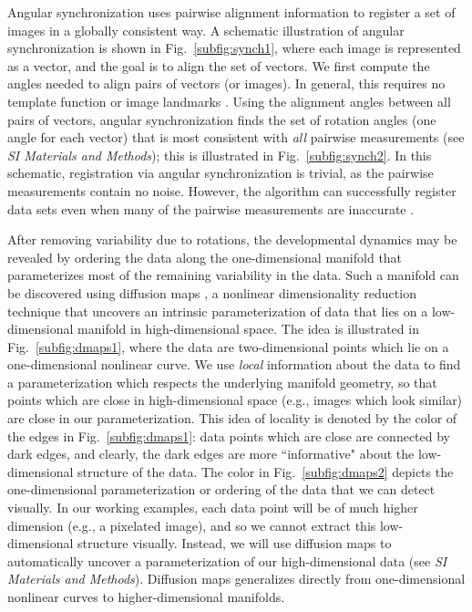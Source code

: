 \documentclass[twocolumn, 10pt]{article}
\newcommand{\SI}[0]{\textit{SI Materials and Methods}}
\newcommand{\fig}[0]{Fig.}
\begin{document}
Angular synchronization uses pairwise alignment information to register a set of images in a globally consistent way.
%
A schematic illustration of angular synchronization is shown in \fig~\ref{subfig:synch1}, where each image is represented as a vector, and the goal is to align the set of vectors.
%
We first compute the angles needed to align pairs of vectors (or images).  
%
In general, this requires no template function \citep{ahuja2007template} or image landmarks \citep{ian1998statistical}.
%
Using the alignment angles between all pairs of vectors, angular synchronization finds the set of rotation angles (one angle for each vector) that is most consistent with {\it all} pairwise measurements (see \SI); this is illustrated in \fig~\ref{subfig:synch2}.
%
In this schematic, registration via angular synchronization is trivial, as the pairwise measurements contain no noise.
%
However, the algorithm can successfully register data sets even when many of the pairwise measurements are inaccurate \citep{singer2011angular}.

After removing variability due to rotations, the developmental dynamics may be revealed by ordering the data along the one-dimensional manifold that parameterizes most of the remaining variability in the data.
%
Such a manifold can be discovered using diffusion maps \citep{coifman2005geometric}, a nonlinear dimensionality reduction technique that uncovers an intrinsic parameterization of data that lies on a low-dimensional manifold in high-dimensional space.
%
The idea is illustrated in \fig~\ref{subfig:dmaps1}, where the data are two-dimensional points which lie on a one-dimensional nonlinear curve.
%
We use {\it local} information about the data to find a parameterization which respects the underlying manifold geometry, so that points which are close in high-dimensional space (e.g., images which look similar) are close in our parameterization.
%
This idea of locality is denoted by the color of the edges in \fig~\ref{subfig:dmaps1}:
data points which are close are connected by dark edges, and clearly, the dark edges are more ``informative" about the low-dimensional structure of the data.
%
The color in \fig~\ref{subfig:dmaps2} depicts the one-dimensional parameterization or ordering of the data that we can detect visually.
%
In our working examples, each data point will be of much higher dimension (e.g., a pixelated image), and so we cannot extract this low-dimensional structure visually.
%
Instead, we will use diffusion maps to automatically uncover a parameterization of our high-dimensional data (see \SI).
%
Diffusion maps generalizes directly from one-dimensional nonlinear curves to higher-dimensional manifolds.
\end{document}
